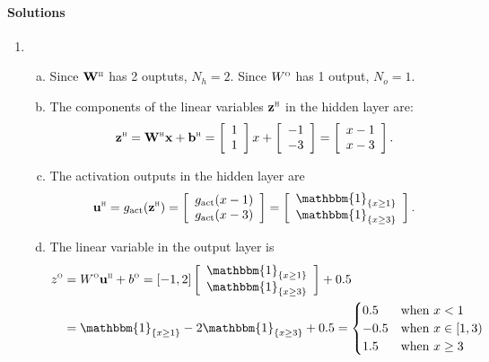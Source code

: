 \documentclass[11pt]{article}
\newcommand{\bbf}{\mathbf{b}}
\newcommand{\ubf}{\mathbf{u}}
\newcommand{\xbf}{\mathbf{x}}
\newcommand{\zbf}{\mathbf{z}}
\newcommand{\Wbf}{\mathbf{W}}
\newcommand{\indic}[1]{\mathbbm{1}_{ \{ {#1} \} }}
\def\hid{\textsc{\tiny H}}
\def\out{\textsc{\tiny O}}
\begin{document}
\paragraph*{Solutions}
\begin{enumerate}
\item
\begin{enumerate}[(a)]
\item Since $\Wbf^\hid$ has 2 ouptuts, $N_h=2$.
Since $W^\out$ has 1 output, $N_o=1$.

\item The components of the linear variables $\zbf^\hid$ in the hidden layer are:
\[
    \zbf^\hid = \Wbf^\hid\xbf + \bbf^\hid =
    \left[ \begin{array}{c} 1 \\ 1 \end{array} \right]x +
    \left[ \begin{array}{c} -1 \\ -3 \end{array} \right] =
    \left[ \begin{array}{c} x-1 \\ x-3 \end{array} \right].
\]


\item The activation outputs in the hidden layer are
\[
    \ubf^\hid = g_{\rm act}(\zbf^\hid) =
     \left[ \begin{array}{c} g_{\rm act}(x-1) \\ g_{\rm act}(x-3) \end{array} \right]
     =
     \left[ \begin{array}{c} \indic{x \geq 1} \\ \indic{x \geq 3} \end{array} \right].
\]

\item The linear variable in the output layer is
\begin{align*}
    z^\out &= W^\out \ubf^\hid + b^\out =
    [-1, 2]\left[ \begin{array}{c} \indic{x \geq 1} \\ \indic{x \geq 3} \end{array} \right]
    + 0.5 \\
    &= \indic{x \geq 1} -2\indic{x \geq 3} + 0.5
    = \begin{cases}
        0.5 & \mbox{when } x < 1 \\
        -0.5 & \mbox{when } x \in [1,3) \\
        1.5 & \mbox{when } x \geq 3
     \end{cases}
\end{align*}


\end{enumerate}
\end{enumerate}
\end{document}
